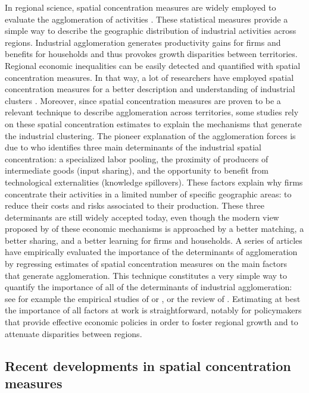 \documentclass[fleqn,10pt]{latex/stylish_article} %
\begin{document}
In regional science, spatial concentration measures are widely employed to evaluate the agglomeration of activities \citep{Combes2004}.
These statistical measures provide a simple way to describe the geographic distribution of industrial activities across regions.
Industrial agglomeration generates productivity gains for firms and benefits for households \citep{Fujita1999, Glaeser2010, Fujita2013} and thus provokes growth disparities between territories.
Regional economic inequalities can be easily detected and quantified with spatial concentration measures.
In that way, a lot of researchers have employed spatial concentration measures for a better description and understanding of industrial clusters \citep[see][ among others]{Feser2000, Giuliani2014, Kerr2015}.
Moreover, since spatial concentration measures are proven to be a relevant technique to describe agglomeration across territories, some studies rely on these spatial concentration estimates to explain the mechanisms that generate the industrial clustering.
The pioneer explanation of the agglomeration forces is due to \citet{Marshall1890} who identifies three main determinants of the industrial spatial concentration: a specialized labor pooling, the proximity of producers of intermediate goods (input sharing), and the opportunity to benefit from technological externalities (knowledge spillovers).
These factors explain why firms concentrate their activities in a limited number of specific geographic areas: to reduce their costs and risks associated to their production.
These three determinants are still widely accepted today, even though the modern view proposed by \citet{Duranton2004} of these economic mechanisms is approached by a better matching, a better sharing, and a better learning for firms and households.
A series of articles have empirically evaluated the importance of the determinants of agglomeration by regressing estimates of spatial concentration measures on the main factors that generate agglomeration.
This technique constitutes a very simple way to quantify the importance of all of the determinants of industrial agglomeration: see for example the empirical studies of \citet{Rosenthal2001} or \citet{Ellison1999}, or the review of \citet{Rosenthal2004}. Estimating at best the importance of all factors at work is straightforward, notably for policymakers that provide effective economic policies in order to foster regional growth and to attenuate disparities between regions.

\subsection{Recent developments in spatial concentration measures}\label{recent-developments-in-spatial-concentration-measures}
\end{document}
